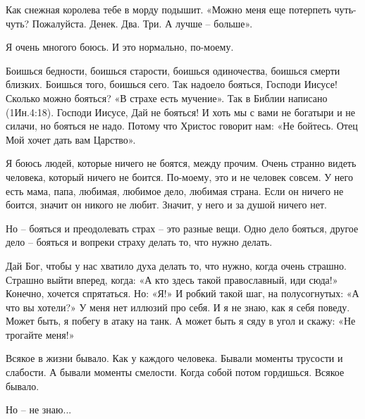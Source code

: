Как снежная королева тебе в морду подышит. «Можно меня еще потерпеть чуть-чуть?
Пожалуйста. Денек. Два. Три. А лучше – больше».

Я очень многого боюсь. И это нормально, по-моему.

Боишься бедности, боишься старости, боишься одиночества, боишься смерти
близких. Боишься того, боишься сего. Так надоело бояться, Господи Иисусе!
Сколько можно бояться? «В страхе есть мучение». Так в Библии написано
(1Ин.4:18). Господи Иисусе, Дай не бояться! И хоть мы с вами не богатыри и не
силачи, но бояться не надо. Потому что Христос говорит нам: «Не бойтесь. Отец
Мой хочет дать вам Царство».

Я боюсь людей, которые ничего не боятся, между прочим. Очень странно видеть
человека, который ничего не боится. По-моему, это и не человек совсем. У него
есть мама, папа, любимая, любимое дело, любимая страна. Если он ничего не
боится, значит он никого не любит. Значит, у него и за душой ничего нет.

Но – бояться и преодолевать страх – это разные вещи. Одно дело бояться, другое
дело – бояться и вопреки страху делать то, что нужно делать.

Дай Бог, чтобы у нас хватило духа делать то, что нужно, когда очень страшно.
Страшно выйти вперед, когда: «А кто здесь такой православный, иди сюда!»
Конечно, хочется спрятаться. Но: «Я!» И робкий такой шаг, на полусогнутых: «А
что вы хотели?» У меня нет иллюзий про себя. И я не знаю, как я себя поведу.
Может быть, я побегу в атаку на танк. А может быть я сяду в угол и скажу: «Не
трогайте меня!»

Всякое в жизни бывало. Как у каждого человека. Бывали моменты трусости и
слабости. А бывали моменты смелости. Когда собой потом гордишься. Всякое
бывало.

Но – не знаю...
